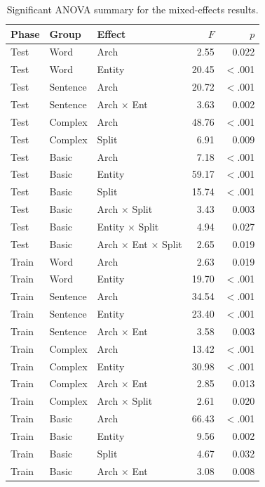 \begin{table}[t]
\centering\small
\begin{tabular}{@{}lllrr@{}}
\toprule
\textbf{Phase} & \textbf{Group} & \textbf{Effect} & $F$ & $p$ \\
\midrule
Test & Word & Arch & 2.55 & 0.022 \\
Test & Word & Entity & 20.45 & $<$.001 \\
Test & Sentence & Arch & 20.72 & $<$.001 \\
Test & Sentence & Arch $\times$ Ent & 3.63 & 0.002 \\
Test & Complex & Arch & 48.76 & $<$.001 \\
Test & Complex & Split & 6.91 & 0.009 \\
Test & Basic & Arch & 7.18 & $<$.001 \\
Test & Basic & Entity & 59.17 & $<$.001 \\
Test & Basic & Split & 15.74 & $<$.001 \\
Test & Basic & Arch $\times$ Split & 3.43 & 0.003 \\
Test & Basic & Entity $\times$ Split & 4.94 & 0.027 \\
Test & Basic & Arch $\times$ Ent $\times$ Split & 2.65 & 0.019 \\
Train & Word & Arch & 2.63 & 0.019 \\
Train & Word & Entity & 19.70 & $<$.001 \\
Train & Sentence & Arch & 34.54 & $<$.001 \\
Train & Sentence & Entity & 23.40 & $<$.001 \\
Train & Sentence & Arch $\times$ Ent & 3.58 & 0.003 \\
Train & Complex & Arch & 13.42 & $<$.001 \\
Train & Complex & Entity & 30.98 & $<$.001 \\
Train & Complex & Arch $\times$ Ent & 2.85 & 0.013 \\
Train & Complex & Arch $\times$ Split & 2.61 & 0.020 \\
Train & Basic & Arch & 66.43 & $<$.001 \\
Train & Basic & Entity & 9.56 & 0.002 \\
Train & Basic & Split & 4.67 & 0.032 \\
Train & Basic & Arch $\times$ Ent & 3.08 & 0.008 \\
\bottomrule
\end{tabular}
\caption{\small Significant ANOVA summary for the mixed-effects results.}
\label{tab:mixed_effects_significant_anova}
\end{table}
